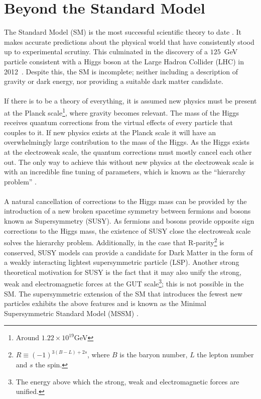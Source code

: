 
\section{Beyond the Standard Model}
\label{sec:Introduction}

The Standard Model (SM) is the most successful scientific theory to date \cite{Salam1964}\cite{Glashow1961}\cite{Weinberg1967}. It makes accurate predictions about the physical world that have consistently stood up to experimental scrutiny. This culminated in the discovery of a $125$~GeV particle consistent with a Higgs boson at the Large Hadron Collider (LHC) in 2012~\cite{ATLASHiggs2012}\cite{CMS2012HiggsPaper}. Despite this, the SM is incomplete; neither including a description of gravity or dark energy, nor providing a suitable dark matter candidate.
\\\\
If there is to be a theory of everything, it is assumed new physics must be present at the Planck scale\footnote{Around $1.22\times 10^{19}$GeV}, where gravity becomes relevant. The mass of the Higgs receives quantum corrections from the virtual effects of every particle that couples to it. If new physics exists at the Planck scale it will have an overwhelmingly large contribution to the mass of the Higgs. As the Higgs exists at the electroweak scale, the quantum corrections must mostly cancel each other out. The only way to achieve this without new physics at the electroweak scale is with an incredible fine tuning of parameters, which is known as the ``hierarchy problem'' \cite{SUSYprimerMartin:1997ns}. 
\\\\
A natural cancellation of corrections to the Higgs mass can be provided by the introduction of a new broken spacetime symmetry between fermions and bosons known as Supersymmetry (SUSY). As fermions and bosons provide opposite sign corrections to the Higgs mass, the existence of SUSY close the electroweak scale solves the hierarchy problem. Additionally, in the case that R-parity\footnote{$R\equiv (-1)^{3(B-L)+2s}$, where $B$ is the baryon number, $L$ the lepton number and $s$ the spin.} is conserved, SUSY models can provide a candidate for Dark Matter in the form of a weakly interacting lightest supersymmetric particle (LSP). Another strong theoretical motivation for SUSY is the fact that it may also unify the strong, weak and electromagnetic forces at the GUT scale\footnote{The energy above which the strong, weak and electromagnetic forces are unified.}; this is not possible in the SM. The supersymmetric extension of the SM that introduces the fewest new particles exhibits the above features and is known as the Minimal Supersymmetric Standard Model (MSSM) \cite{SUSYprimerMartin:1997ns}.

